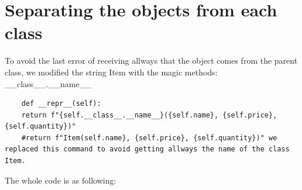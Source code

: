 \documentclass{article}
\begin{document}
\section{Separating the objects from each class}
To avoid the last error of receiving allways that the object comes from the parent class, we modified the string Item with the magic methods: \_\_class\_\_.\_\_name\_\_

\begin{lstlisting}
	def __repr__(self):
	return f"{self.__class__.__name__}({self.name}, {self.price}, {self.quantity})"
	#return f"Item(self.name}, {self.price}, {self.quantity})" we replaced this command to avoid getting allways the name of the class Item.
\end{lstlisting}

The whole code is as following:
\end{document}
